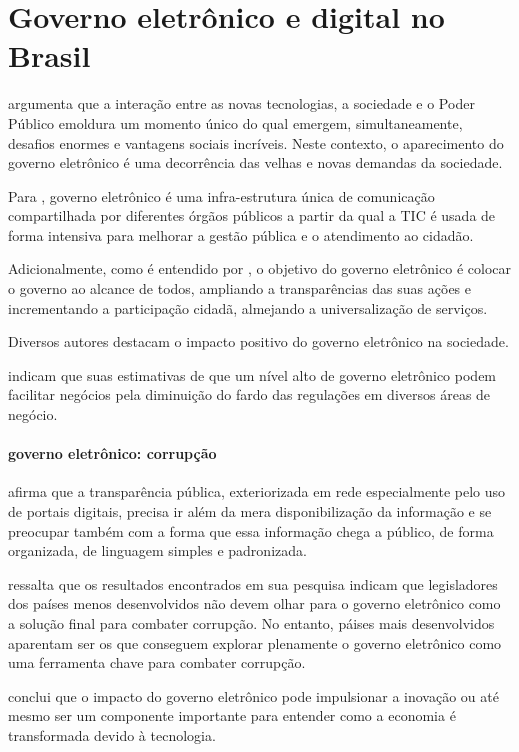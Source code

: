 \chapter{Governo eletrônico e digital no Brasil}

\cite{rover2009introduccao} argumenta que a interação entre as novas tecnologias, a sociedade e o Poder Público emoldura um momento único do qual emergem, simultaneamente, desafios enormes e vantagens sociais incríveis. Neste contexto, o aparecimento do governo eletrônico é uma decorrência das velhas e novas demandas da sociedade.

Para \cite{rover2009introduccao}, governo eletrônico é uma infra-estrutura única de comunicação compartilhada por diferentes órgãos públicos a partir da qual a TIC é usada de forma intensiva para melhorar a gestão pública e o atendimento ao cidadão.

Adicionalmente, como é entendido por \cite{rover2009introduccao}, o objetivo do governo eletrônico é colocar o governo ao alcance de todos, ampliando a transparências das suas ações e incrementando a participação cidadã, almejando a universalização de serviços.

Diversos autores destacam o impacto positivo do governo eletrônico na sociedade. 

\cite{martins2022digital} indicam que suas estimativas de que um nível alto de governo eletrônico podem facilitar negócios pela diminuição do fardo das regulações em diversos áreas de negócio.

\subsubsection{governo eletrônico: corrupção}

\cite{tavares2022governo} afirma que a transparência pública, exteriorizada em rede especialmente pelo uso de portais digitais, precisa ir além da mera disponibilização da informação e se preocupar também com a forma que essa informação chega a público, de forma organizada, de linguagem simples e padronizada.

\cite{martins2018war} ressalta que os resultados encontrados em sua pesquisa indicam que legisladores dos países menos desenvolvidos não devem olhar para o governo eletrônico como a solução final para combater corrupção. No entanto, páises mais desenvolvidos aparentam ser os que conseguem explorar plenamente o governo eletrônico como uma ferramenta chave para combater corrupção.

\cite{kotenok2020government} conclui que o impacto do governo eletrônico pode impulsionar a inovação ou até mesmo ser um componente importante para entender como a economia é transformada devido à tecnologia.

